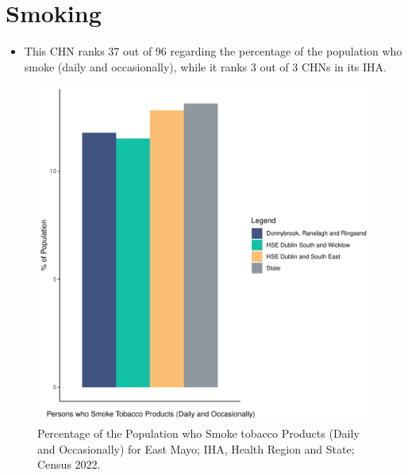 \documentclass{article}
\begin{document}
\pagebreak

\section{Smoking}\label{sect:Smoking}
\begin{itemize}
\item This CHN ranks  37 out of 96 regarding the percentage of the population who smoke (daily and occasionally), while it ranks   3 out of 3 CHNs in its IHA.
\end{itemize}
\begin{figure}[H]
	\centering
	\includegraphics[width = 120mm]{../figures/SmokingED.pdf}
	\caption{Percentage of the Population who Smoke tobacco Products (Daily and Occasionally) for East Mayo; IHA, Health Region and State; Census 2022.}
	\label{fig:2ae19629-1a6a-13a3-e055-000000000001}
	\end{figure}
	
\end{document}
